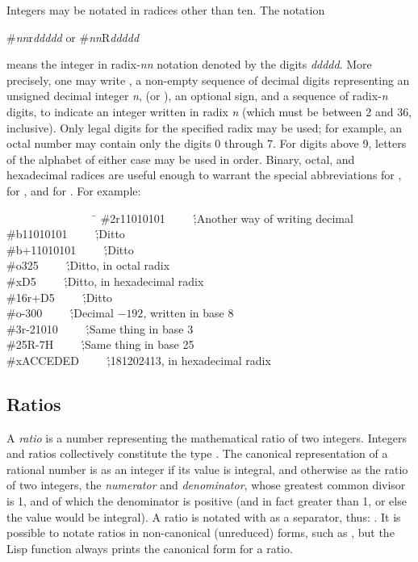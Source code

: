 Integers may be notated in radices other than ten.
The notation
\begin{lisp}
\#{\it nn}r{\it ddddd}     {\rm or}     \#{\it nn}R{\it ddddd}
\end{lisp}
means the integer in radix-{\it nn} notation denoted by the digits
{\it ddddd}.  More precisely, one may write \cd{\#}, a non-empty sequence
of decimal digits representing an unsigned decimal integer {\it n},
 (or ), an optional sign, and a sequence of radix-{\it n}
digits, to indicate an integer written in radix {\it n} (which must be
between 2 and 36, inclusive).  Only legal digits
for the specified radix may be used; for example, an octal number may
contain only the digits 0 through 7.  For digits above 9,
letters of the alphabet of either
case may be used in order.  Binary, octal, and
hexadecimal radices are useful enough to warrant the special
abbreviations  for ,  for , and
 for .
For example:
\begin{lisp}
~~~~~~~~~~~~~~~~\=\kill
\>\#2r11010101~~~~~\';{\rm Another way of writing  decimal} \\
\>\#b11010101~~~~~\';{\rm Ditto} \\
\>\#b+11010101~~~~~\';{\rm Ditto} \\
\>\#o325~~~~~\';{\rm Ditto, in octal radix} \\
\>\#xD5~~~~~\';{\rm Ditto, in hexadecimal radix} \\
\>\#16r+D5~~~~~\';{\rm Ditto} \\
\>\#o-300~~~~~\';{\rm Decimal \(-192\), written in base 8} \\
\>\#3r-21010~~~~~\';{\rm Same thing in base 3} \\
\>\#25R-7H~~~~~\';{\rm Same thing in base 25} \\
\>\#xACCEDED~~~~~\';{\rm 181202413, in hexadecimal radix}
\end{lisp}

\subsection{Ratios}

A {\it ratio} is a number representing the mathematical ratio
of two integers.  Integers and ratios collectively constitute
the type .
The canonical representation of a rational number is as an
integer if its value is integral, and otherwise as the ratio of two
integers, the {\it numerator} and {\it denominator}, whose greatest
common divisor is 1, and of which the denominator is positive (and in
fact greater than 1, or else the value would be integral).
A ratio is notated with
\cd{/} as a separator, thus: .  It is possible to notate
ratios in non-canonical (unreduced) forms, such as , but the
Lisp function  always prints the canonical form for a
ratio.

